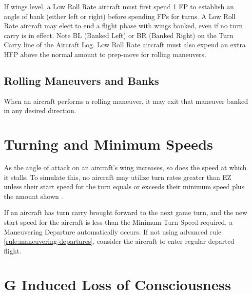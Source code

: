 \begin{advancedrules}
    If wings level, a Low Roll Rate aircraft must first spend 1 FP to establish an angle of bank (either left or right) before spending FPs for turns. A Low Roll Rate aircraft may elect to end a flight phase with wings banked, even if no turn carry is in effect. Note BL (Banked Left) or BR (Banked Right) on the Turn Carry line of the Aircraft Log.  Low Roll Rate aircraft must also expend an extra HFP above the normal amount to prep-move for rolling maneuvers.

    \subsection{Rolling Maneuvers and Banks}
    When an aircraft performs a rolling maneuver, it may exit that maneuver banked in any desired direction.

    \section{Turning and Minimum Speeds}
    \label{rule:turning-and-minimum-speeds}

    As the angle of attack on an aircraft's wing increases, so does the speed at which it stalls. To simulate this, no aircraft may utilize turn rates greater than EZ unless their start speed for the turn equals or exceeds their minimum speed plus the amount shown .


    If an aircraft has turn carry brought forward to the next game turn, and the new start speed for the aircraft is less than the Minimum Turn Speed required, a Maneuvering Departure automatically occurs. If not using advanced rule \ref{rule:maneuvering-departures}, consider the aircraft to enter regular departed flight.

    \section{G Induced Loss of Consciousness}
    \label{rule:gloc}


\end{advancedrules}
